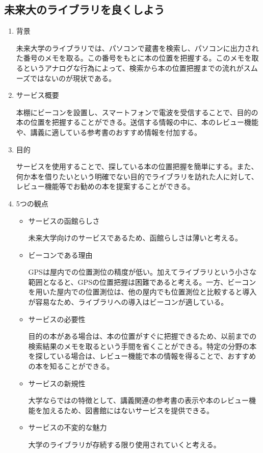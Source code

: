 \subsection{未来大のライブラリを良くしよう}
\begin{enumerate}
    \item 背景
    \par 未来大学のライブラリでは、パソコンで蔵書を検索し、パソコンに出力された番号のメモを取る。この番号をもとに本の位置を把握する。このメモを取るというアナログな行為によって、検索から本の位置把握までの流れがスムーズではないのが現状である。
    \item サービス概要
    \par 本棚にビーコンを設置し、スマートフォンで電波を受信することで、目的の本の位置を把握することができる。送信する情報の中に、本のレビュー機能や、講義に適している参考書のおすすめ情報を付加する。
    \item 目的
    \par サービスを使用することで、探している本の位置把握を簡単にする。また、何か本を借りたいという明確でない目的でライブラリを訪れた人に対して、レビュー機能等でお勧めの本を提案することができる。
    \item 5つの観点
    \begin{itemize}
        \item サービスの函館らしさ
        \par 未来大学向けのサービスであるため、函館らしさは薄いと考える。
        \item ビーコンである理由
        \par GPSは屋内での位置測位の精度が低い。加えてライブラリという小さな範囲となると、GPSの位置把握は困難であると考える。一方、ビーコンを用いた屋内での位置測位は、他の屋内でも位置測位と比較すると導入が容易なため、ライブラリへの導入はビーコンが適している。
        \item サービスの必要性
        \par 目的の本がある場合は、本の位置がすぐに把握できるため、以前までの検索結果のメモを取るという手間を省くことができる。特定の分野の本を探している場合は、レビュー機能で本の情報を得ることで、おすすめの本を知ることができる。
        \item サービスの新規性
        \par 大学ならではの特徴として、講義関連の参考書の表示や本のレビュー機能を加えるため、図書館にはないサービスを提供できる。
        \item サービスの不変的な魅力
        \par 大学のライブラリが存続する限り使用されていくと考える。
    \end{itemize}
\end{enumerate}

